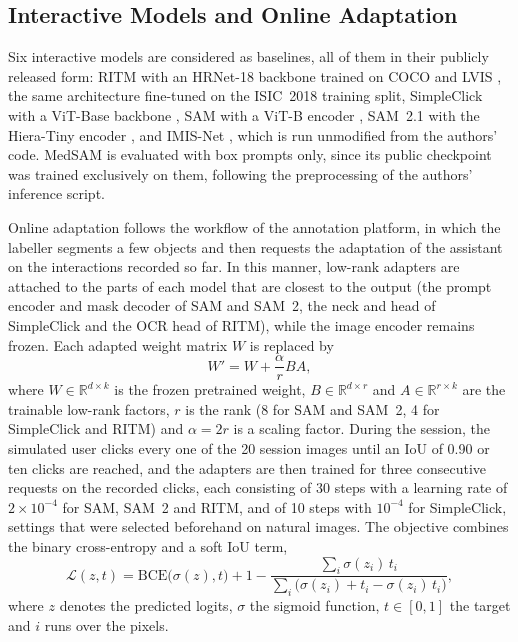\documentclass[runningheads]{llncs}
\begin{document}
\subsection{Interactive Models and Online Adaptation}

Six interactive models are considered as baselines, all of them in their publicly released form: RITM with an HRNet-18 backbone trained on COCO and LVIS \cite{sofiiuk2022ritm}, the same architecture fine-tuned on the ISIC~2018 training split, SimpleClick with a ViT-Base backbone \cite{liu2023simpleclick}, SAM with a ViT-B encoder \cite{kirillov2023sam}, SAM~2.1 with the Hiera-Tiny encoder \cite{ravi2025sam2}, and IMIS-Net \cite{cheng2025imis}, which is run unmodified from the authors' code. MedSAM \cite{ma2024medsam} is evaluated with box prompts only, since its public checkpoint was trained exclusively on them, following the preprocessing of the authors' inference script.

Online adaptation follows the workflow of the annotation platform, in which the labeller segments a few objects and then requests the adaptation of the assistant on the interactions recorded so far. In this manner, low-rank adapters \cite{hu2022lora} are attached to the parts of each model that are closest to the output (the prompt encoder and mask decoder of SAM and SAM~2, the neck and head of SimpleClick and the OCR head of RITM), while the image encoder remains frozen. Each adapted weight matrix $W$ is replaced by
\begin{equation}
W' = W + \frac{\alpha}{r} B A,
\end{equation}
where $W \in \mathbb{R}^{d\times k}$ is the frozen pretrained weight, $B \in \mathbb{R}^{d\times r}$ and $A \in \mathbb{R}^{r\times k}$ are the trainable low-rank factors, $r$ is the rank (8 for SAM and SAM~2, 4 for SimpleClick and RITM) and $\alpha = 2r$ is a scaling factor. During the session, the simulated user clicks every one of the 20 session images until an IoU of 0.90 or ten clicks are reached, and the adapters are then trained for three consecutive requests on the recorded clicks, each consisting of 30 steps with a learning rate of $2\times10^{-4}$ for SAM, SAM~2 and RITM, and of 10 steps with $10^{-4}$ for SimpleClick, settings that were selected beforehand on natural images. The objective combines the binary cross-entropy and a soft IoU term,
\begin{equation}
\mathcal{L}(z, t) = \mathrm{BCE}\big(\sigma(z), t\big) + 1 - \frac{\sum_i \sigma(z_i)\, t_i}{\sum_i \big(\sigma(z_i) + t_i - \sigma(z_i)\, t_i\big)},
\label{eq:loss}
\end{equation}
where $z$ denotes the predicted logits, $\sigma$ the sigmoid function, $t \in [0,1]$ the target and $i$ runs over the pixels.
\end{document}
